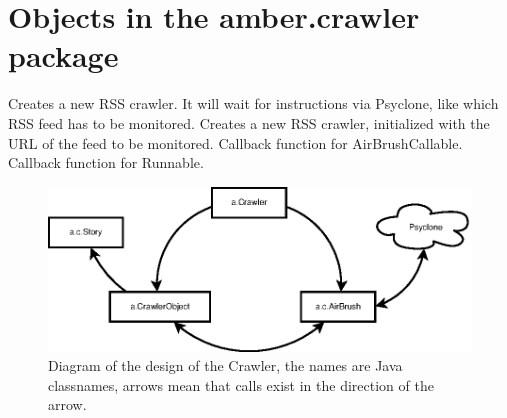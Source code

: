 \section{Objects in the amber.crawler package}




\begin{classmetadata}
\end{classmetadata}

\begin{interface}
    {Creates a new RSS crawler. It will wait for instructions via Psyclone,
      like which RSS feed has to be monitored.}
    {Creates a new RSS crawler, initialized with the URL of the feed to be
      monitored.}
    {Callback function for AirBrushCallable.}
    {Callback function for Runnable.}
\end{interface}




\begin{figure}
  \centering
  \includegraphics{image/crawler}
  \caption{
    Diagram of the design of the Crawler, the names are Java classnames, arrows
    mean that calls exist in the direction of the arrow.
  }
\end{figure}


